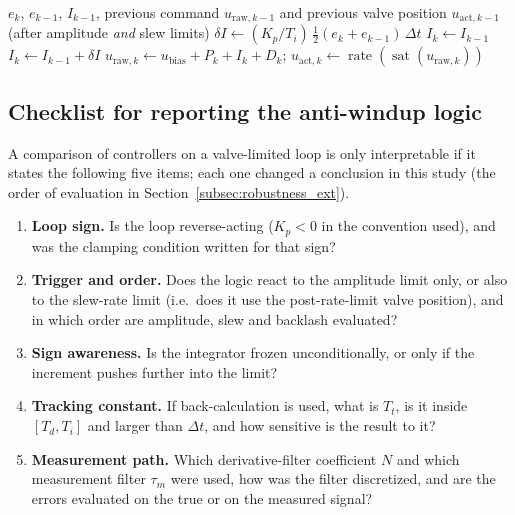 \begin{algorithm}[t]
\caption{Integrator update with directional amplitude- and rate-aware clamping (one sampling instant, reverse- or direct-acting).}\label{alg:integrator}
\begin{algorithmic}[1]
\Require $e_k$, $e_{k-1}$, $I_{k-1}$, previous command $u_{\text{raw},k-1}$ and previous valve position $u_{\text{act},k-1}$ (after amplitude \emph{and} slew limits)
\State $\delta I \gets (K_p/T_i)\,\tfrac12 (e_k + e_{k-1})\,\Delta t$
    \State $I_k \gets I_{k-1}$ 
\Else
    \State $I_k \gets I_{k-1} + \delta I$
\EndIf
\State $u_{\text{raw},k} \gets u_{\text{bias}} + P_k + I_k + D_k$; \quad $u_{\text{act},k} \gets \operatorname{rate}(\operatorname{sat}(u_{\text{raw},k}))$
\end{algorithmic}
\end{algorithm}

\subsection{Checklist for reporting the anti-windup logic}
\label{subsec:checklist}
A comparison of controllers on a valve-limited loop is only interpretable if it states the following five items; each one changed a conclusion in this study (the order of evaluation in Section~\ref{subsec:robustness_ext}).
\begin{enumerate}
    \item \textbf{Loop sign.} Is the loop reverse-acting ($K_p<0$ in the convention used), and was the clamping condition written for that sign?
    \item \textbf{Trigger and order.} Does the logic react to the amplitude limit only, or also to the slew-rate limit (i.e.\ does it use the post-rate-limit valve position), and in which order are amplitude, slew and backlash evaluated?
    \item \textbf{Sign awareness.} Is the integrator frozen unconditionally, or only if the increment pushes further into the limit?
    \item \textbf{Tracking constant.} If back-calculation is used, what is $T_t$, is it inside $[T_d, T_i]$ and larger than $\Delta t$, and how sensitive is the result to it?
    \item \textbf{Measurement path.} Which derivative-filter coefficient $N$ and which measurement filter $\tau_m$ were used, how was the filter discretized, and are the errors evaluated on the true or on the measured signal?
\end{enumerate}

